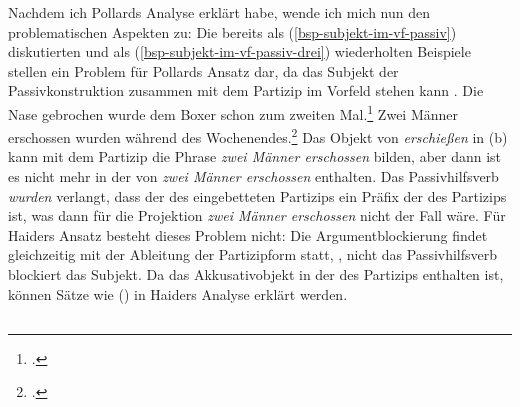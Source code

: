{Nachdem ich Pollards Analyse erklärt habe, wende ich mich nun den problematischen
Aspekten zu: Die bereits als (\ref{bsp-subjekt-im-vf-passiv}) diskutierten und als
(\ref{bsp-subjekt-im-vf-passiv-drei}) wiederholten Beispiele stellen ein Problem
für Pollards Ansatz dar, da das Subjekt der Passivkonstruktion
zusammen mit dem Partizip im Vorfeld stehen kann \citep[]{Mueller99a}.
\eal
\label{bsp-subjekt-im-vf-passiv-drei}
\ex{}
Die Nase gebrochen wurde dem Boxer schon zum zweiten Mal.\footnote{
        .
}
\ex{}
Zwei Männer erschossen wurden    während des Wochenendes.\footnote{
        .%
        }
\label{bsp-subjekt-im-vf-passiv-letzt-drei}
\zl
Das Objekt von \emph{erschießen} in (b) kann mit dem Partizip die Phrase
\emph{zwei Männer erschossen} bilden, aber dann ist es nicht mehr in der \compsl von
\emph{zwei Männer erschossen} enthalten. Das Passivhilfsverb \emph{wurden} verlangt,
dass der \ergw des eingebetteten Partizips ein Präfix der \compsl des Partizips ist,
was dann für die Projektion \emph{zwei Männer erschossen} nicht der Fall wäre.
Für Haiders Ansatz besteht dieses Problem nicht: Die Argumentblockierung
findet gleichzeitig mit der Ableitung der Partizipform statt, \dash, nicht das Passivhilfsverb
blockiert das Subjekt. Da das Akkusativobjekt in der \compsl des Partizips enthalten
ist, können Sätze wie () in Haiders Analyse erklärt werden.


\subsection{}
\label{sec-kathol-passive-raising}

}
